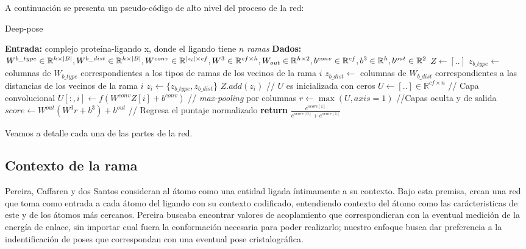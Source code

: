 A continuación se presenta un pseudo-código de alto nivel del proceso
de la red:
\newpage
\begin{algorithm}[H]
  \caption{Deep-pose}
  \begin{algorithmic}[1]
    \State \textbf{Entrada:} complejo proteína-ligando x,
    donde el ligando tiene $n$ \textit{ramas}
    \State \textbf{Dados:}\newline
                           $W^{b\_type} \in \mathbb{R}^{h\times |B|}, W^{b\_dist}
                           \in \mathbb{R}^{h\times |B|},\newline
                           W^{conv} \in \mathbb{R}^{|z_i| \times cf}, W^3 \in
                           \mathbb{R}^{cf \times h},\newline
                           W_{out} \in \mathbb{R}^{h \times 2},\newline
                           b^{conv} \in \mathbb{R}^{cf}, b^{3} \in
                           \mathbb{R}^{h},\newline
                           b^{out} \in \mathbb{R}^{2}$
    \State $Z \gets [..]$
      \State $z_{b\_type} \gets$ columnas de $W_{b\_type}$
      correspondientes a los tipos de ramas de los vecinos de la
      rama $i$
      \State $z_{b\_dist} \gets$  columnas de $W_{b\_dist}$
      correspondientes a las distancias de los vecinos de la rama $i$
      \State $z_i \gets \{z_{b\_type}, z_{b\_dist}$\}
      \State $Z.add(z_i)$
    \EndFor
    \State // $U$ es inicializada con ceros
    \State $U \gets [..] \in \mathbb{R}^{cf \times n}$
    \State // Capa convolucional
      \State $U[:,i]\gets f(W^{conv}Z[i] + b^{conv})$
    \EndFor
    \State // \textit{max-pooling} por columnas
    \State $r\gets \max(U, axis=1)$
    \State //Capas oculta y de salida
    \State $score\gets W^{out}(W^3r + b^3) + b^{out}$
    \State // Regresa el puntaje normalizado
    \State \textbf{return} $\frac{e^{score[1]}}{e^{score[0]}+e^{score[1]}}$
  \end{algorithmic}
\end{algorithm}
Veamos a detalle cada una de las partes de la red.

\subsection{Contexto de la rama}
Pereira, Caffaren y dos Santos \cite{dossantos} consideran al átomo
como una entidad ligada íntimamente a su contexto. Bajo esta premisa,
crean una red que toma como entrada a cada átomo del ligando con su
contexto codificado, entendiendo contexto del átomo como las
carácteristicas de este y de los átomos más cercanos.  Pereira buscaba
encontrar valores de acoplamiento que correspondieran con la eventual
medición de la energía de enlace, sin importar cual fuera la
conformación necesaria para poder realizarlo; nuestro enfoque busca
dar preferencia a la indentificación de poses que correspondan con
una eventual pose cristalográfica.

